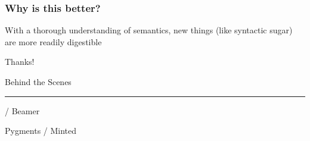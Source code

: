 \documentclass[20pt]{beamer}
\begin{document}
\begin{frame}
\frametitle{Why is this better?}
With a thorough understanding of semantics, new things (like syntactic sugar)
are more readily digestible
\end{frame}

\begin{frame}
\begin{center}
\vspace{2.5cm}
{Thanks!}
\vspace{1.5cm}

Behind the Scenes
\par\rule[3mm]{3cm}{0.1mm}

\XeLaTeX / Beamer

Pygments / Minted
\end{center}
\end{frame}
\end{document}
